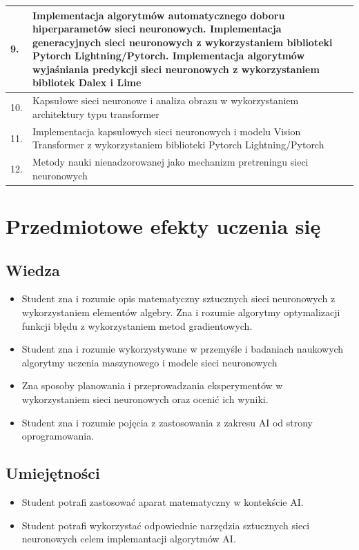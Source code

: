 \documentclass[12pt, a4paper]{article}
\begin{document}
\begin{longtable}{|p{1.5cm}|p{6.5cm}|p{6.5cm}|}
  \hline
  9. & Implementacja algorytmów automatycznego doboru hiperparametów sieci neuronowych. Implementacja generacyjnych sieci neuronowych z wykorzystaniem biblioteki Pytorch Lightning/Pytorch. Implementacja algorytmów wyjaśniania predykcji sieci neuronowych z wykorzystaniem bibliotek Dalex i Lime &  \\
  \hline
  10. & Kapsułowe sieci neuronowe i analiza obrazu w wykorzystaniem architektury typu transformer &  \\
  \hline
  11. & Implementacja kapsułowych sieci neuronowych i modelu Vision Transformer z wykorzystaniem biblioteki Pytorch Lightning/Pytorch &  \\
  \hline
  12. & Metody nauki nienadzorowanej jako mechanizm pretreningu sieci neuronowych &  \\
  \hline
\end{longtable}

\section{Przedmiotowe efekty uczenia się}

\subsection*{Wiedza}
\begin{itemize}
  \item Student zna i rozumie opis matematyczny sztucznych sieci neuronowych z wykorzystaniem elementów algebry. Zna i rozumie algorytmy optymalizacji funkcji błędu z wykorzystaniem metod gradientowych.
  \item Student zna i rozumie wykorzystywane w przemyśle i badaniach naukowych algorytmy uczenia maszynowego i modele sieci neuronowych
  \item Zna sposoby  planowania i przeprowadzania eksperymentów w wykorzystaniem sieci neuronowych oraz ocenić ich wyniki.
  \item Student zna i rozumie pojęcia z zastosowania z zakresu AI od strony oprogramowania.
\end{itemize}

\subsection*{Umiejętności}
\begin{itemize}
  \item Student potrafi zastosować aparat matematyczny w kontekście AI.
  \item Student potrafi wykorzystać odpowiednie narzędzia sztucznych sieci neuronowych celem implemantacji algorytmów AI.
\end{itemize}
\end{document}
